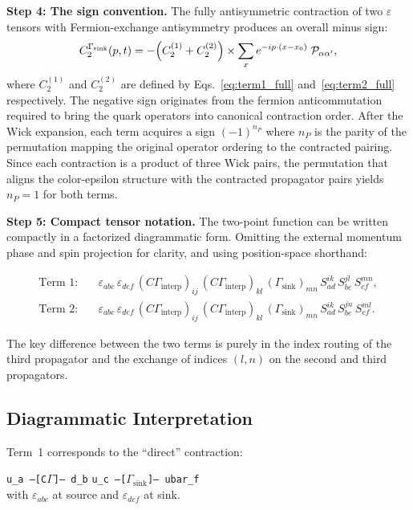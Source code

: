 \documentclass[11pt,a4paper]{article}
\newcommand{\eps}{\varepsilon}
\newcommand{\Gammaint}{\Gamma_{\text{interp}}}
\newcommand{\Gammasink}{\Gamma_{\text{sink}}}
\newcommand{\Cmat}{C}
\newcommand{\xvec}{x}
\newcommand{\xzerovec}{x_0}
\begin{document}
\medskip\noindent
\textbf{Step 4: The sign convention.}
The fully antisymmetric contraction of two $\eps$ tensors with Fermion-exchange
antisymmetry produces an overall minus sign:
\begin{equation}
  C_2^{\Gammasink}(p, t) =
    -\Bigl( C_2^{(1)} + C_2^{(2)} \Bigr) \times
    \sum_{\xvec} e^{-ip\cdot(\xvec-\xzerovec)} \; \mathcal{P}_{\alpha\alpha'},
  \label{eq:C2_sign}
\end{equation}
where $C_2^{(1)}$ and $C_2^{(2)}$ are defined by Eqs.~\eqref{eq:term1_full}
and~\eqref{eq:term2_full} respectively. The negative sign originates from the fermion
anticommutation required to bring the quark operators into canonical contraction
order. After the Wick expansion, each term acquires a sign $(-1)^{n_P}$ where $n_P$
is the parity of the permutation mapping the original operator ordering to the
contracted pairing. Since each contraction is a product of three Wick pairs, the
permutation that aligns the color-epsilon structure with the contracted propagator
pairs yields $n_P = 1$ for both terms.

\medskip\noindent
\textbf{Step 5: Compact tensor notation.}
The two-point function can be written compactly in a factorized diagrammatic form.
Omitting the external momentum phase and spin projection for clarity, and using
position-space shorthand:

\begin{align}
  \text{Term~1:}&\quad
    \eps_{abc}\,\eps_{def}\,
    (\Cmat\Gammaint)_{ij}\,(\Cmat\Gammaint)_{kl}\,
    (\Gammasink)_{mn}\,
    S^{ik}_{ad}\,S^{jl}_{be}\,S^{mn}_{cf}, \\[4pt]
  \text{Term~2:}&\quad
    \eps_{abc}\,\eps_{def}\,
    (\Cmat\Gammaint)_{ij}\,(\Cmat\Gammaint)_{kl}\,
    (\Gammasink)_{mn}\,
    S^{ik}_{ad}\,S^{jn}_{be}\,S^{ml}_{cf}.
\end{align}

The key difference between the two terms is purely in the index routing of the third
propagator and the exchange of indices $(l,n)$ on the second and third propagators.

\subsection{Diagrammatic Interpretation}

Term~1 corresponds to the ``direct'' contraction:
\begin{center}
  \texttt{u\_a --[C$\Gamma$]-- d\_b} \quad \texttt{u\_c --[$\Gammasink$]-- ubar\_f} \\
  with $\eps_{abc}$ at source and $\eps_{def}$ at sink.
\end{center}
\end{document}
